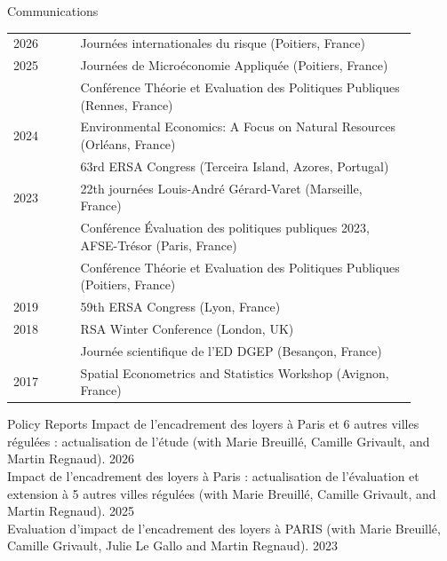\documentclass{resume} %
\begin{document}
\begin{rSection}{Communications}
\begin{table}[H]
{\def\arraystretch{1.5}\tabcolsep=0pt
\begin{tabular}{p{0.15\linewidth}p{0.75\linewidth}}
2026 & Journées internationales du risque (Poitiers, France) \\
2025 & Journées de Microéconomie Appliquée (Poitiers, France) \\
	 & Conférence Théorie et Evaluation des Politiques Publiques (Rennes, France)\\
2024 & Environmental Economics: A Focus on Natural Resources (Orléans, France) \\
     & 63rd ERSA Congress (Terceira Island, Azores, Portugal) \\
2023 & 22th journées Louis-André Gérard-Varet (Marseille, France)\\
     & Conférence Évaluation des politiques publiques 2023, AFSE-Trésor (Paris, France)\\
     & Conférence Théorie et Evaluation des Politiques Publiques (Poitiers, France)\\
2019 & 59th ERSA Congress (Lyon, France)\\
2018 & RSA Winter Conference (London, UK)\\
     & Journée scientifique de l’ED DGEP (Besançon, France)\\
2017 & Spatial Econometrics and Statistics Workshop (Avignon, France)\\
\end{tabular}%
}
\end{table}
\end{rSection}
\begin{rSection}{Policy Reports}
\vspace*{4mm}
Impact de l’encadrement des loyers à Paris et 6 autres villes régulées : actualisation de l’étude (with Marie Breuillé, Camille Grivault, and Martin Regnaud). 2026 \\

Impact de l’encadrement des loyers à Paris : actualisation de l’évaluation et extension à 5 autres villes régulées (with Marie Breuillé, Camille Grivault, and Martin Regnaud). 2025 \\

Evaluation d’impact de l’encadrement des loyers à PARIS (with Marie Breuillé, Camille Grivault, Julie Le Gallo and Martin Regnaud). 2023 \\
\end{rSection}
\end{document}
